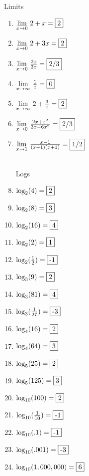 \documentclass{article}
\begin{document}
\newtheorem*{theorem*}{Theorem}
	
	\centerline{\Large{ Limits}}\vspace{12 pt}
	\begin{enumerate} 
	\item $\underset{x \rightarrow 0}{\lim} \ 2+x=\fbox{2}$
	\item $\underset{x \rightarrow 0}{\lim} \ 2+3x=\fbox{2}$
	\item $\underset{x \rightarrow 0}{\lim} \ \frac{2x}{3x}=\fbox{2/3}$
\item $\underset{x \rightarrow \infty}{\lim} \ \frac{1}{x}=\fbox{0}$
	\item $\underset{x \rightarrow \infty}{\lim} \ 2 + \frac{3}{x}=\fbox{2}$ 
	\item $\underset{x \rightarrow 0}{\lim} \ \frac{2x + x^2}{3x - 6x^2}=\fbox{2/3}$
	\item $\underset{x \rightarrow 1}{\lim} \ \frac{x-1}{(x-1)(x+1)}=\fbox{1/2}$ 
	\\ \\
	\centerline{\Large{ Logs \ \ \ \ \ \ \ \ \ \ \ }}\vspace{12 pt}
	\item $\log_2(4) = \fbox{2}$
	\item $\log_2(8) = \fbox{3}$
	\item $\log_2(16) = \fbox{4}$
	\item $\log_2(2) = \fbox{1}$
	\item $\log_2(\frac{1}{2}) = \fbox{-1}$
	\item $\log_3(9) = \fbox{2}$
	\item $\log_3(81) = \fbox{4}$
	\item $\log_3(\frac{1}{27}) = \fbox{-3}$
	\item $\log_4(16) = \fbox{2}$
	\item $\log_{4}(64) = \fbox{3}$
	\item $\log_5(25) = \fbox{2}$
	\item $\log_5(125) = \fbox{3}$
	\item $\log_{10}(100) = \fbox{2}$
	\item $\log_{10}(\frac{1}{10}) = \fbox{-1}$
	\item $\log_{10}(.1) = \fbox{-1}$
	\item $\log_{10}(.001) = \fbox{-3}$
	\item $\log_{10}(1,000,000) = \fbox{6}$
	
	\end{enumerate}
	
	\vfill
\centerline{}
\end{document}
